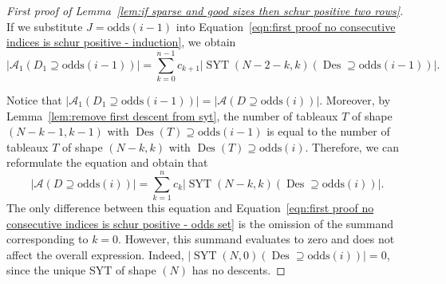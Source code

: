 \documentclass[ALCO]{cedram}
\newcommand{\Des}{\operatorname{Des}}
\newcommand{\Syt}{\operatorname{SYT}}
\newcommand{\A}{\mathcal{A}}
\newcommand{\odds}{\mathrm{odds}}
\begin{document}
\begin{proof}[First proof of Lemma~\ref{lem:if sparse and good sizes then schur positive two rows}]
    If we substitute $J = \odds(i-1)$ into Equation~\ref{eqn:first proof no consecutive indices is schur positive - induction}, we obtain
    \[
        \left|\A_1(D_1 \supseteq \odds(i-1))\right| = 
         \sum_{k=0}^{n-1} c_{k+1} \left|\Syt(N-2-k,k)(\Des \supseteq \odds(i-1))\right|.
    \]

    Notice that $\left|\A_1(D_1 \supseteq \odds(i-1))\right| = \left|\A(D \supseteq \odds(i))\right|$. Moreover, by Lemma~\ref{lem:remove first descent from syt}, the number of tableaux $T$ of shape $(N-k-1,k-1)$ with $\Des(T) \supseteq \odds(i-1)$ is equal to the number of tableaux $T$ of shape $(N-k,k)$ with $\Des(T) \supseteq \odds(i)$. Therefore, we can reformulate the equation and obtain that
    \[
        \left|\A(D \supseteq \odds(i))\right| = 
         \sum_{k=1}^{n} c_k \left|\Syt(N-k,k)(\Des \supseteq \odds(i))\right|.
    \]
    The only difference between this equation and Equation~\eqref{eqn:first proof no consecutive indices is schur positive - odds set} is the omission of the summand corresponding to $k=0$. However, this summand evaluates to zero and does not affect the overall expression. Indeed, $\left|\Syt(N,0)(\Des \supseteq \odds(i))\right| = 0$, since the unique SYT of shape $(N)$ has no descents.
\end{proof}
\end{document}
